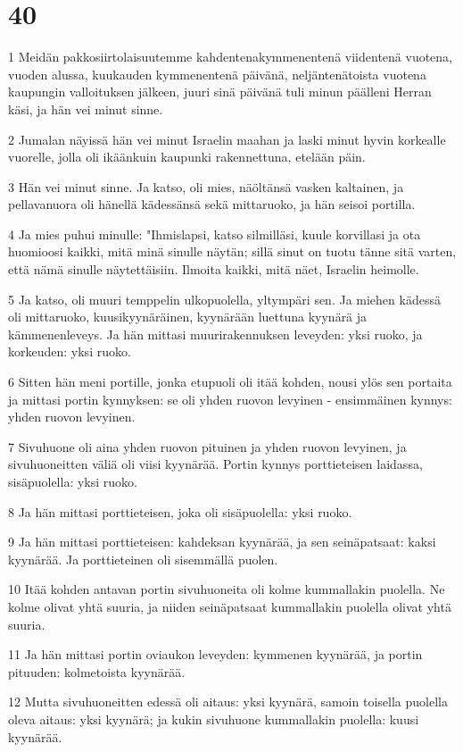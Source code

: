 \chapter{40}

\par 1 Meidän pakkosiirtolaisuutemme kahdentenakymmenentenä viidentenä vuotena, vuoden alussa, kuukauden kymmenentenä päivänä, neljäntenätoista vuotena kaupungin valloituksen jälkeen, juuri sinä päivänä tuli minun päälleni Herran käsi, ja hän vei minut sinne.
\par 2 Jumalan näyissä hän vei minut Israelin maahan ja laski minut hyvin korkealle vuorelle, jolla oli ikäänkuin kaupunki rakennettuna, etelään päin.
\par 3 Hän vei minut sinne. Ja katso, oli mies, näöltänsä vasken kaltainen, ja pellavanuora oli hänellä kädessänsä sekä mittaruoko, ja hän seisoi portilla.
\par 4 Ja mies puhui minulle: "Ihmislapsi, katso silmilläsi, kuule korvillasi ja ota huomioosi kaikki, mitä minä sinulle näytän; sillä sinut on tuotu tänne sitä varten, että nämä sinulle näytettäisiin. Ilmoita kaikki, mitä näet, Israelin heimolle.
\par 5 Ja katso, oli muuri temppelin ulkopuolella, yltympäri sen. Ja miehen kädessä oli mittaruoko, kuusikyynäräinen, kyynärään luettuna kyynärä ja kämmenenleveys. Ja hän mittasi muurirakennuksen leveyden: yksi ruoko, ja korkeuden: yksi ruoko.
\par 6 Sitten hän meni portille, jonka etupuoli oli itää kohden, nousi ylös sen portaita ja mittasi portin kynnyksen: se oli yhden ruovon levyinen - ensimmäinen kynnys: yhden ruovon levyinen.
\par 7 Sivuhuone oli aina yhden ruovon pituinen ja yhden ruovon levyinen, ja sivuhuoneitten väliä oli viisi kyynärää. Portin kynnys porttieteisen laidassa, sisäpuolella: yksi ruoko.
\par 8 Ja hän mittasi porttieteisen, joka oli sisäpuolella: yksi ruoko.
\par 9 Ja hän mittasi porttieteisen: kahdeksan kyynärää, ja sen seinäpatsaat: kaksi kyynärää. Ja porttieteinen oli sisemmällä puolen.
\par 10 Itää kohden antavan portin sivuhuoneita oli kolme kummallakin puolella. Ne kolme olivat yhtä suuria, ja niiden seinäpatsaat kummallakin puolella olivat yhtä suuria.
\par 11 Ja hän mittasi portin oviaukon leveyden: kymmenen kyynärää, ja portin pituuden: kolmetoista kyynärää.
\par 12 Mutta sivuhuoneitten edessä oli aitaus: yksi kyynärä, samoin toisella puolella oleva aitaus: yksi kyynärä; ja kukin sivuhuone kummallakin puolella: kuusi kyynärää.
